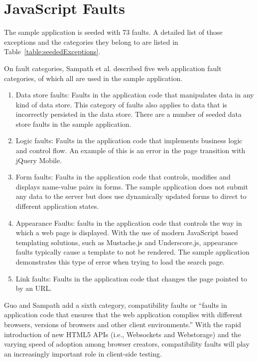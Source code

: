 \section{JavaScript Faults}
The sample application is seeded with 73 faults.  A detailed list of those exceptions and the categories they belong to are listed in Table~\ref{table:seededExceptions}.  

On fault categories, Sampath et al. described five web application fault categories\cite{sampath2007applying}, of which all are used in the sample application.

\begin{enumerate}
\item Data store faults: Faults in the application code that manipulates data in any kind of data store.  This category of faults also applies to data that is incorrectly persisted in the data store.  There are a number of seeded data store faults in the sample application.

\item Logic faults: Faults in the application code that implements business logic and control flow.  An example of this is an error in the page transition with jQuery Mobile. 

\item Form faults: Faults in the application code that controls, modifies and displays name-value pairs in forms.  The sample application does not submit any data to the server but does use dynamically updated forms to direct to different application states.

\item Appearance Faults: faults in the application code that controls the way in which a web page is displayed.  With the use of modern JavaScript based templating solutions, such as Mustache.js and Underscore.js, appearance faults typically cause a template to not be rendered.  The sample application demonstrates this type of error when trying to load the search page.

\item Link faults: Faults in the application code that changes the page pointed to by an URL.
\end{enumerate}

Guo and Sampath \cite{guo2008web} add a sixth category, compatibility faults or ``faults in application code that ensures that the web application complies with different browsers, versions of browsers and other client environments.''  With the rapid introduction of new HTML5 APIs (i.e., Websockets and Webstorage) and the varying speed of adoption among browser creators, compatibility faults will play an increasingly important role in client-side testing.  


